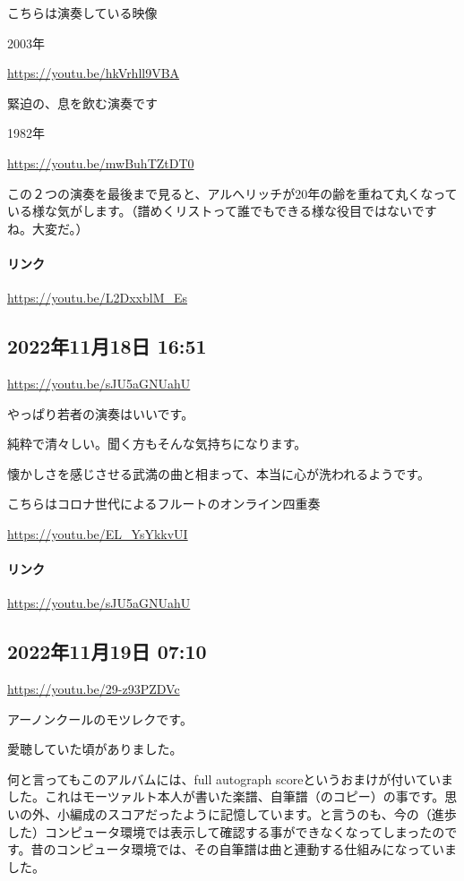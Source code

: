 こちらは演奏している映像

2003年

\url{https://youtu.be/hkVrhll9VBA}

緊迫の、息を飲む演奏です

1982年

\url{https://youtu.be/mwBuhTZtDT0}

この２つの演奏を最後まで見ると、アルへリッチが20年の齢を重ねて丸くなっている様な気がします。（譜めくリストって誰でもできる様な役目ではないですね。大変だ。）

\paragraph{リンク}
\url{https://youtu.be/L2DxxblM_Es}

\subsection*{2022年11月18日 16:51}

\url{https://youtu.be/sJU5aGNUahU}

やっぱり若者の演奏はいいです。

純粋で清々しい。聞く方もそんな気持ちになります。

懐かしさを感じさせる武満の曲と相まって、本当に心が洗われるようです。

こちらはコロナ世代によるフルートのオンライン四重奏

\url{https://youtu.be/EL_YsYkkvUI}

\paragraph{リンク}
\url{https://youtu.be/sJU5aGNUahU}

\subsection*{2022年11月19日 07:10}

\url{https://youtu.be/29-z93PZDVc}

アーノンクールのモツレクです。

愛聴していた頃がありました。

何と言ってもこのアルバムには、full autograph scoreというおまけが付いていました。これはモーツァルト本人が書いた楽譜、自筆譜（のコピー）の事です。思いの外、小編成のスコアだったように記憶しています。と言うのも、今の（進歩した）コンピュータ環境では表示して確認する事ができなくなってしまったのです。昔のコンピュータ環境では、その自筆譜は曲と連動する仕組みになっていました。

